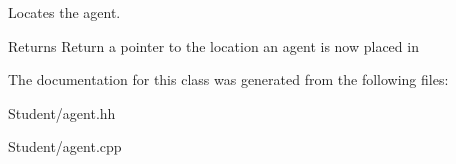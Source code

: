 Locates the agent. 

\begin{DoxyReturn}{Returns}
Return a pointer to the location an agent is now placed in 
\end{DoxyReturn}


The documentation for this class was generated from the following files\-:\begin{DoxyCompactItemize}
\item 
Student/agent.\-hh\item 
Student/agent.\-cpp\end{DoxyCompactItemize}
